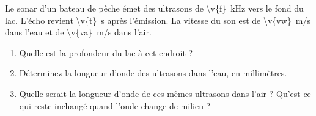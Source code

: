 Le sonar d'un bateau de pêche émet des ultrasons de \qty{\v{f}}{kHz} vers le fond du lac. L'écho revient \qty{\v{t}}{s} après l'émission. La vitesse du son est de \qty{\v{vw}}{m/s} dans l'eau et de \qty{\v{va}}{m/s} dans l'air.

\begin{enumerate}[label=\alph*)]
    \item Quelle est la profondeur du lac à cet endroit ?
    \item Déterminez la longueur d'onde des ultrasons dans l'eau, en millimètres.
    \item Quelle serait la longueur d'onde de ces mêmes ultrasons dans l'air ? Qu'est-ce qui reste inchangé quand l'onde change de milieu ?
\end{enumerate}

